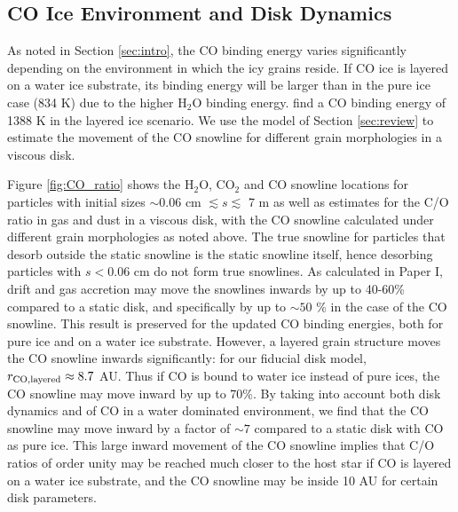 \documentclass[apj]{emulateapj}
\begin{document}
\subsection{CO Ice Environment and Disk Dynamics}

As noted in Section \ref{sec:intro}, the CO binding energy varies significantly depending on the environment in which the icy grains reside. If CO ice is layered on a water ice substrate, its binding energy will be larger than in the pure ice case (834 K) due to the higher H$_2$O binding energy. \citet{fayolle16} find a CO binding energy of 1388 K in the layered ice scenario. We use the model of Section \ref{sec:review} to estimate the movement of the CO snowline for different grain morphologies in a viscous disk.

Figure \ref{fig:CO_ratio} shows the H$_2$O, CO$_2$ and CO snowline locations for particles with initial sizes $\sim0.06$ cm $\lesssim s \lesssim$ 7 m as well as estimates for the C/O ratio in gas and dust in a viscous disk, with the CO snowline calculated under different grain morphologies as noted above. The true snowline for particles that desorb outside the static snowline is the static snowline itself, hence desorbing particles with $s<0.06$ cm do not form true snowlines. As calculated in Paper I, drift and gas accretion may move the snowlines inwards by up to 40-60\% compared to a static disk, and specifically by up to $\sim50$ \% in the case of the CO snowline. This result is preserved for the updated CO binding energies, both for pure ice and on a water ice substrate. However, a layered grain structure moves the CO snowline inwards significantly: for our fiducial disk model, $r_{\rm CO, layered} \approx 8.7$ AU. Thus if CO is bound to water ice instead of pure ices, the CO snowline may move inward by up to 70\%. By taking into account both disk dynamics and of CO in a water dominated environment, we find that the CO snowline may move inward by a factor of $\sim$$7$ compared to a static disk with CO as pure ice.  This large inward movement of the CO snowline implies that C/O ratios of order unity may be reached much closer to the host star if CO is layered on a water ice substrate, and the CO snowline may be inside 10 AU for certain disk parameters.  
\end{document}
